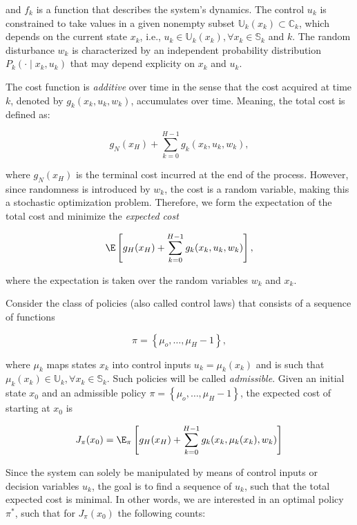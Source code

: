 and $f_k$ is a function that describes the system's dynamics. The control $u_k$
is constrained to take values in a given nonempty subset $\mathbb{U}_k(x_k)
\subset \mathbb{C}_k$, which depends on the current state $x_k$, i.e., $u_k \in
\mathbb{U}_k(x_k), \forall x_k \in \mathbb{S}_k$ and $k$. The random disturbance
$w_k$ is characterized by an independent probability distribution $P_k(\cdot\mid
x_k,u_k)$ that may depend explicity on $x_k$ and $u_k$.

The cost function is \textit{additive} over time in the sense that the cost
acquired at time $k$, denoted by $g_k(x_k, u_k, w_k)$, accumulates over time.
Meaning, the total cost is defined as:

\begin{equation*}
  g_N(x_H) + \sum\limits_{k=0}^{H-1}{g_k(x_k, u_k, w_k)},
\end{equation*}

where $g_N(x_H)$ is the terminal cost incurred at the end of the process.
However, since randomness is introduced by $w_k$, the cost is a random variable,
making this a stochastic optimization problem. Therefore, we form the
expectation of the total cost and minimize the \textit{expected cost}

\begin{equation*}
  \E\left[g_H(x_H) + \sum\limits_{k=0}^{H-1}{g_k(x_k, u_k, w_k)}\right],
\end{equation*}

where the expectation is taken over the random variables $w_k$ and $x_k$.

Consider the class of policies (also called control laws) that consists of a
sequence of functions 

\begin{equation}
  \pi = \left\{\mu_o,\dots,\mu_H-1\right\},
\end{equation}

where $\mu_k$ maps states $x_k$ into control inputs $u_k = \mu_k(x_k)$ and is
such that $\mu_k(x_k) \in \mathbb{U}_k, \forall x_k \in \mathbb{S}_k$. Such
policies will be called \textit{admissible}. Given an initial state $x_0$ and an
admissible policy $\pi = \left\{\mu_o,\dots,\mu_H-1\right\}$, the expected cost
of starting at $x_0$ is

\begin{equation}
  J_\pi(x_0) = \E_\pi\left[g_H(x_H) + \sum\limits_{k=0}^{H-1}{g_k(x_k, \mu_k(x_k), w_k)}\right]
\end{equation}

Since the system can solely be manipulated by means of control inputs or
decision variables $u_k$, the goal is to find a sequence of $u_k$, such that the
total expected cost is minimal. In other words, we are interested in an optimal
policy $\pi^*$, such that for $J_\pi(x_0)$ the following counts:

